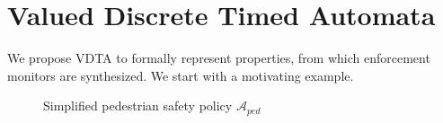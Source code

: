 \section{Valued Discrete Timed Automata}
 We propose \acf{VDTA} to formally represent properties,
 from which enforcement monitors are synthesized. We start with a
 motivating example.

%	


\begin{figure}[t]
	\centering
	
	\caption{Simplified pedestrian safety policy $\mathcal{A}_{ped}$}
	\label{fig:vdta-car-rte}
\end{figure}

